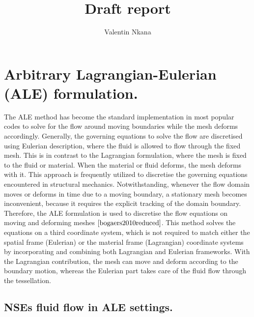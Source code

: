 \documentclass[10pt,a4paper,twoside]{article}
\author{Valentin Nkana}
\title{Draft report}
\begin{document}
	
\maketitle
	
	
\section{Arbitrary Lagrangian-Eulerian (ALE) formulation.}
The ALE method has become the standard implementation in most popular codes to
solve for the flow around moving boundaries while the mesh deforms accordingly. Generally, the governing equations to solve the flow are discretised using Eulerian description, where the fluid is allowed to flow through the fixed mesh. This is in  contrast to the Lagrangian formulation, where the mesh is fixed to the fluid or material. When the material or fluid deforms, the mesh deforms with it. This approach is frequently utilized to discretise the governing equations encountered in structural mechanics. Notwithstanding, whenever the flow domain moves or deforms in time due to a moving boundary, a stationary mesh becomes inconvenient, because it requires the explicit tracking of the domain boundary. Therefore, the ALE formulation is used to discretise the flow equations on moving and deforming meshes $\cite{bogaers2010reduced}$. This method solves the equations on a third
coordinate system, which is not required to match either the spatial frame (Eulerian) or the material frame (Lagrangian)
 coordinate systems by incorporating and combining both Lagrangian and Eulerian frameworks. With the Lagrangian contribution, the mesh can move and deform according to the boundary motion, whereas the Eulerian part takes care of the fluid flow through the tessellation.

\subsection{NSEs fluid flow in ALE settings.}









\end{document}
